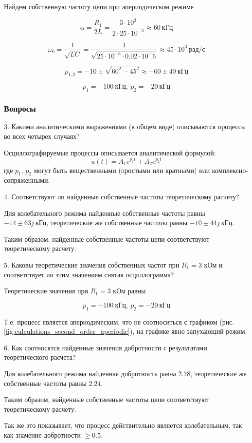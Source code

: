 Найдем собственную частоту цепи при апериодическом режиме

\[
    \alpha = \frac{R_1}{2L}
    = \frac{3 \cdot 10^3}{2 \cdot 25 \cdot 10^{-3}}
    \approx 60\ \text{кГц}
\]

\[
    \omega_0 = \frac{1}{\sqrt{LC}}
    = \frac{1}{\sqrt{25 \cdot 10^{-3} \cdot 0.02 \cdot 10^-6}}
    \approx 45 \cdot 10^3 \ \text{рад/с}
\]

\[
    p_{1,2} = -10 \pm \sqrt{60^2 - 45^2}
    \approx -60 \pm 40\ \text{кГц}
\]

\[
    p_1 = -100\ \text{кГц},\ p_2 = -20\ \text{кГц}
\]




\subsubsection{Вопросы}

3. Какими аналитическими выражениями (в общем виде) описываются
процессы во всех четырех случаях?

Осциллографируемые процессы описывается аналитической формулой:
\[
    u(t) = A_1 e^{p_1 t} + A_2 e^{p_2 t}
\]
где $p_1$, $p_2$ могут быть вещественными (простыми или кратными) или комплексно-сопряженными.


4. Соответствуют ли найденные собственные частоты теоретическому расчету?

Для колебательного режима найденные собственные частоты равны $-14 \pm 63j\ \text{кГц}$,
теоретические же собственные частоты равны $-10 \pm 44j\ \text{кГц}$.

Таким образом, найденные собственные частоты цепи соответствуют
теоретическому расчету.

5. Каковы теоретические значения собственных частот при $R_1 = 3$ кОм
и соответствует ли этим значениям снятая осциллограмма?

Теоретические значения при $R_1 = 3$ кОм равны

\[
    p_1 = -100\ \text{кГц},\ p_2 = -20\ \text{кГц}
\]

Т.е. процесс является апериодическим, что не соотноситься
с графиком (рис. \ref*{fig:culculations_second_order_aperiodic}), 
на графике явно запухающий режим.

6. Как соотносятся найденные значения добротности с 
результатами теоретического расчета? 


Для колебательного режима найденная добротность равна $2.78$,
теоретические же собственные частоты равны $2.24$.

Таким образом, найденные собственные частоты цепи соответствуют
теоретическому расчету.

Так же это показывает, что процесс действительно является
колебательным, так как значение добротности $\ge 0.5$.
